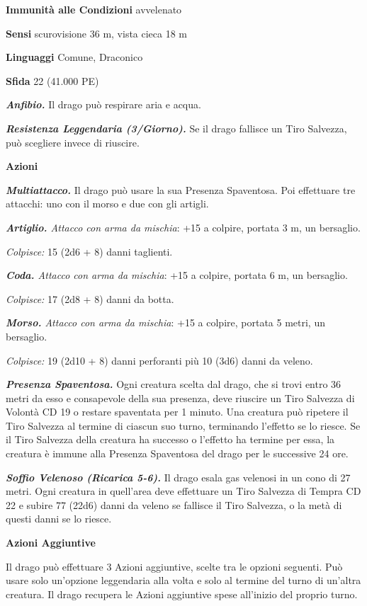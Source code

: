 \begin{multicols}{2}
\textbf{Immunità alle Condizioni}
avvelenato

\textbf{Sensi} scurovisione 36 m, vista cieca 18 m

\textbf{Linguaggi} Comune, Draconico 

\textbf{Sfida} 22 (41.000 PE)

\emph{\textbf{Anfibio.}} Il drago può respirare aria e acqua.

\emph{\textbf{Resistenza Leggendaria (3/Giorno).}} Se il drago fallisce un Tiro Salvezza, può scegliere invece di riuscire.

\textbf{Azioni}

\emph{\textbf{Multiattacco.}} Il drago può usare la sua Presenza Spaventosa. Poi effettuare tre attacchi: uno con il morso e due con gli artigli.

\emph{\textbf{Artiglio.} Attacco con arma da mischia}: +15 a colpire, portata 3 m, un bersaglio.

\emph{Colpisce:} 15 (2d6 + 8) danni taglienti.

\emph{\textbf{Coda.} Attacco con arma da mischia}: +15 a colpire, portata 6 m, un bersaglio.

\emph{Colpisce:} 17 (2d8 + 8) danni da botta.

\emph{\textbf{Morso.} Attacco con arma da mischia}: +15 a colpire, portata 5 metri, un bersaglio.

\emph{Colpisce:} 19 (2d10 + 8) danni perforanti più 10 (3d6) danni da veleno.

\emph{\textbf{Presenza Spaventosa.}} Ogni creatura scelta dal drago, che si trovi entro 36 metri da esso e consapevole della sua presenza, deve riuscire un Tiro Salvezza di Volontà CD 19 o restare spaventata per 1 minuto. Una creatura può ripetere il Tiro Salvezza al termine di ciascun suo turno, terminando l'effetto se lo riesce. Se il Tiro Salvezza della creatura ha successo o l'effetto ha termine per essa, la creatura è immune alla Presenza Spaventosa del drago per le successive 24 ore.

\emph{\textbf{Soffio Velenoso (Ricarica 5-6).}} Il drago esala gas velenosi in un cono di 27 metri. Ogni creatura in quell'area deve effettuare un Tiro Salvezza di Tempra CD 22 e subire 77 (22d6) danni da veleno se fallisce il Tiro Salvezza, o la metà di questi danni se lo riesce.

\textbf{Azioni Aggiuntive}

Il drago può effettuare 3 Azioni aggiuntive, scelte tra le opzioni seguenti. Può usare solo un'opzione leggendaria alla volta e solo al termine del turno di un'altra creatura. Il drago recupera le Azioni aggiuntive spese all'inizio del proprio turno.


\end{multicols}
